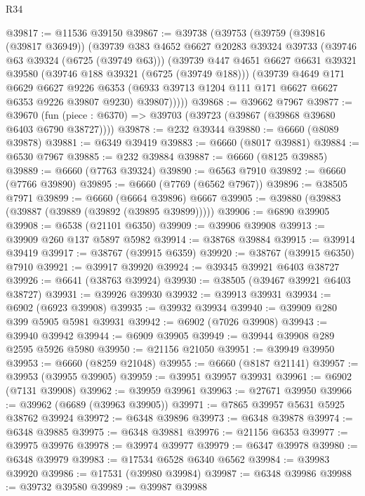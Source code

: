 \begin{lexlean}{R34}
\begin{coremodule}
@39817 := @11536 @39150
@39867 := @39738
    (@39753
      (@39759
        (@39816 (@39817 @36949))
        (@39739
          @383
          @4652
          @6627
          @20283
          @39324
          @39733
          (@39746 @63 @39324 (@6725 (@39749 @63)))
          (@39739
            @447
            @4651
            @6627
            @6631
            @39321
            @39580
            (@39746 @188 @39321 (@6725 (@39749 @188)))
            (@39739
              @4649
              @171
              @6629
              @6627
              @9226
              @6353
              (@6933 @39713 @1204 @111 @171 @6627 @6627 @6353 @9226 @39807 @9230)
              @39807)))))
@39868 := @39662 @7967
@39877 := @39670
    (fun (piece : @6370) => @39703 (@39723 (@39867 (@39868 @39680 @6403 @6790 @38727))))
@39878 := @232 @39344
@39880 := @6660 (@8089 @39878)
@39881 := @6349 @39419
@39883 := @6660 (@8017 @39881)
@39884 := @6530 @7967
@39885 := @232 @39884
@39887 := @6660 (@8125 @39885)
@39889 := @6660 (@7763 @39324)
@39890 := @6563 @7910
@39892 := @6660 (@7766 @39890)
@39895 := @6660 (@7769 (@6562 @7967))
@39896 := @38505 @7971
@39899 := @6660 (@6664 @39896) @6667
@39905 := @39880 (@39883 (@39887 (@39889 (@39892 (@39895 @39899)))))
@39906 := @6890 @39905
@39908 := @6538 (@21101 @6350)
@39909 := @39906 @39908
@39913 := @39909 @260 @137 @5897 @5982
@39914 := @38768 @39884
@39915 := @39914 @39419
@39917 := @38767 (@39915 @6359)
@39920 := @38767 (@39915 @6350) @7910
@39921 := @39917 @39920
@39924 := @39345 @39921 @6403 @38727
@39926 := @6641 (@38763 @39924)
@39930 := @38505 (@39467 @39921 @6403 @38727)
@39931 := @39926 @39930
@39932 := @39913 @39931
@39934 := @6902 (@6923 @39908)
@39935 := @39932 @39934
@39940 := @39909 @280 @399 @5905 @5981 @39931
@39942 := @6902 (@7026 @39908)
@39943 := @39940 @39942
@39944 := @6909 @39905
@39949 := @39944 @39908 @289 @2595 @5926 @5980
@39950 := @21156 @21050
@39951 := @39949 @39950
@39953 := @6660 (@8259 @21048)
@39955 := @6660 (@8187 @21141)
@39957 := @39953 (@39955 @39905)
@39959 := @39951 @39957 @39931
@39961 := @6902 (@7131 @39908)
@39962 := @39959 @39961
@39963 := @27671 @39950
@39966 := @39962 (@6689 (@39963 @39905))
@39971 := @7865 @39957 @5631 @5925 @38762 @39924
@39972 := @6348 @39896
@39973 := @6348 @39878
@39974 := @6348 @39885
@39975 := @6348 @39881
@39976 := @21156 @6353
@39977 := @39975 @39976
@39978 := @39974 @39977
@39979 := @6347 @39978
@39980 := @6348 @39979
@39983 := @17534 @6528 @6340 @6562
@39984 := @39983 @39920
@39986 := @17531 (@39980 @39984)
@39987 := @6348 @39986
@39988 := @39732 @39580
@39989 := @39987 @39988

\end{coremodule}
\end{lexlean}
